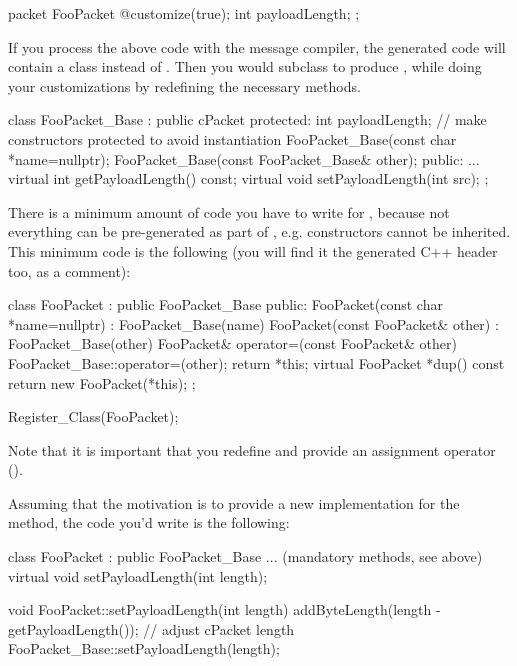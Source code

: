 \begin{msg}
packet FooPacket
{
   @customize(true);
   int payloadLength;
};
\end{msg}

If you process the above code with the message compiler, the generated code will
contain a  class instead of . Then you would
subclass  to produce , while doing your
customizations by redefining the necessary methods.

\begin{cpp}
class FooPacket_Base : public cPacket
{
  protected:
    int payloadLength;
    // make constructors protected to avoid instantiation
    FooPacket_Base(const char *name=nullptr);
    FooPacket_Base(const FooPacket_Base& other);
  public:
    ...
    virtual int getPayloadLength() const;
    virtual void setPayloadLength(int src);
};
\end{cpp}

There is a minimum amount of code you have to write for , because
not everything can be pre-generated as part of , e.g.
constructors cannot be inherited. This minimum code is the following (you will
find it the generated C++ header too, as a comment):

\begin{cpp}
class FooPacket : public FooPacket_Base
{
  public:
    FooPacket(const char *name=nullptr) : FooPacket_Base(name) {}
    FooPacket(const FooPacket& other) : FooPacket_Base(other) {}
    FooPacket& operator=(const FooPacket& other)
        {FooPacket_Base::operator=(other); return *this;}
    virtual FooPacket *dup() const {return new FooPacket(*this);}
};

Register_Class(FooPacket);
\end{cpp}

Note that it is important that you redefine  and
provide an assignment operator ().

Assuming that the motivation is to provide a new implementation for the
 method, the code you'd write is the following:

\begin{cpp}
class FooPacket : public FooPacket_Base
{
    ... (mandatory methods, see above)
    virtual void setPayloadLength(int length);
}

void FooPacket::setPayloadLength(int length)
{
    addByteLength(length - getPayloadLength()); // adjust cPacket length
    FooPacket_Base::setPayloadLength(length);
}
\end{cpp}


